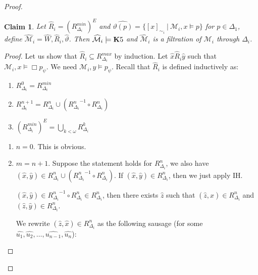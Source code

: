\documentclass[a4paper]{article}
\theoremstyle{defin}
\theoremstyle{theorem}
\theoremstyle{prop}
\theoremstyle{lemma}
\theoremstyle{fact}
\theoremstyle{ex}
\theoremstyle{col}
\theoremstyle{claim}
\newtheorem{claim}{Claim}
\begin{document}
\begin{proof}
\begin{enumerate}
  \begin{claim}
    Let $\widehat{R}_i = (R^{min}_{\Delta_i})^{E}$ and
    $\widehat{\vartheta(p)} = \{ [x]_{\sim_i} \: | \: \mathcal{M}_i, x \models p \}$ for $p \in \Delta_1$, define $\widehat{\mathcal{M}}_i = \widehat{W}, \widehat{R}_i, \widehat{\vartheta}$. Then $\widehat{\mathcal{M}}_i \models {\bf K}5$ and $\widehat{\mathcal{M}}_i$ is a filtration of $\mathcal{M}_i$ through $\Delta_i$.
  \end{claim}
  \begin{proof}
    Let us show that $\widehat{R}_i \subseteq R^{max}_{\Delta_i}$ by induction.
    Let $\hat{x} \widehat{R}_i \hat{y}$ such that $\mathcal{M}_i, x \models \Box p_{\psi}$.
    We need $\mathcal{M}_i, y \models p_{\psi}$.
    Recall that $\widehat{R}_i$ is defined inductively as:
    \begin{enumerate}
      \item $R_{\Delta_i}^{0} = R_{\Delta_i}^{min}$
      \item $R_{\Delta_i}^{n + 1} = R_{\Delta_i}^{n} \cup ({R_{\Delta_i}^{n}}^{-1} \circ R_{\Delta_i}^{n})$
      \item $(R^{min}_{\Delta_i})^{E} = \bigcup_{k < \omega} R_{\Delta_i}^{k}$
    \end{enumerate}

    \begin{enumerate}
      \item $n = 0$. This is obvious.
      \item $m = n + 1$. Suppose the statement holds for $R_{\Delta_i}^{n}$, we also have $(\hat{x}, \hat{y}) \in R_{\Delta_i}^{n} \cup ({R_{\Delta_i}^{n}}^{-1} \circ R_{\Delta_i}^{n})$.
      If $(\hat{x}, \hat{y}) \in R_{\Delta_i}^{n}$, then we just apply IH.

      $(\hat{x}, \hat{y}) \in {R_{\Delta_i}^{n}}^{-1} \circ R_{\Delta_i}^{n} \in R_{\Delta_i}^{n}$, then there exists $\hat{z}$ such that $(\hat{z}, \hat{x}) \in R_{\Delta_i}^{n}$ and $(\hat{z}, \hat{y}) \in R_{\Delta_i}^{n}$.

      We rewrite $(\hat{z}, \hat{x}) \in R_{\Delta_i}^{n}$ as the following sausage (for some $\widehat{u_1},  \widehat{u_2}, \dots, \widehat{u_{n - 1}}, \widehat{u_{n}}$):

      \vspace{\baselineskip}

\vspace{\baselineskip}


\end{enumerate}
\end{proof}
\end{enumerate}
\end{proof}
\end{document}

